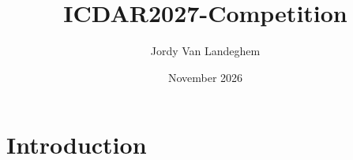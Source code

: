 \documentclass{article}
\title{ICDAR2027-Competition}
\author{Jordy Van Landeghem}
\date{November 2026}
\begin{document}
\maketitle

\section{Introduction}
\end{document}
